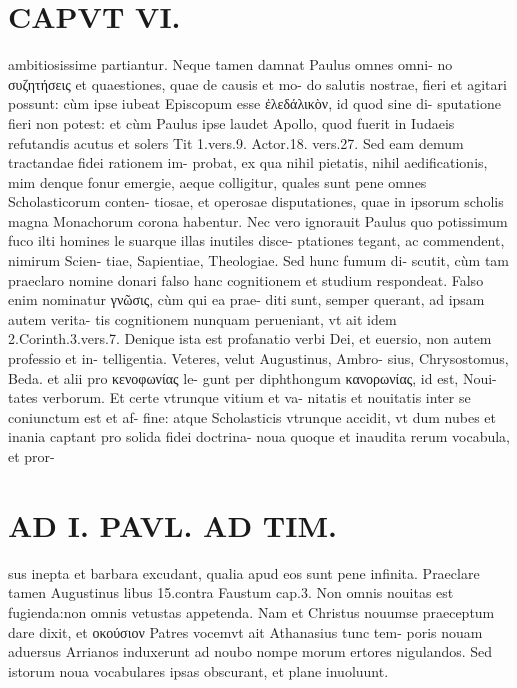 \documentclass{article}
\begin{document}
\begin{pages}
\section*{CAPVT  VI. }
\marginpar{[ p.511 ]}\pstart ambitiosissime partiantur.  \pend\pstart Neque tamen damnat Paulus omnes omni- no συζητήσεις et quaestiones, quae de causis et mo- do salutis nostrae, fieri et agitari possunt: cùm ipse iubeat Episcopum esse ἐλεδάλικὸν, id quod sine di- sputatione fieri non potest: et cùm Paulus ipse laudet Apollo, quod fuerit in Iudaeis refutandis acutus et solers Tit 1.vers.9. Actor.18. vers.27. Sed eam demum tractandae fidei rationem im- probat, ex qua nihil pietatis, nihil aedificationis, mim denque fonur emergie, aeque colligitur, quales sunt pene omnes Scholasticorum conten- tiosae, et operosae disputationes, quae in ipsorum scholis magna Monachorum corona habentur.  \pend\pstart Nec vero ignorauit Paulus quo potissimum fuco ilti homines le suarque illas inutiles disce- ptationes tegant, ac commendent, nimirum Scien- tiae, Sapientiae, Theologiae. Sed hunc fumum di- scutit, cùm tam praeclaro nomine donari falso hanc cognitionem et studium respondeat.  \pend\pstart Falso enim nominatur γνῶσις, cùm qui ea prae- diti sunt, semper querant, ad ipsam autem verita- tis cognitionem nunquam perueniant, vt ait idem 2.Corinth.3.vers.7. Denique ista est profanatio verbi Dei, et euersio, non autem professio et in- telligentia. Veteres, velut Augustinus, Ambro- sius, Chrysostomus, Beda. et alii pro κενοφωνίας le- gunt per diphthongum κανορωνίας, id est, Noui- tates verborum. Et certe vtrunque vitium et va- nitatis et nouitatis inter se coniunctum est et af- fine: atque Scholasticis vtrunque accidit, vt dum nubes et inania captant pro solida fidei doctrina- noua quoque  et inaudita rerum vocabula, et pror-  \pend
\section*{AD I. PAVL. AD TIM. }
\marginpar{[ p.512 ]}\pstart sus inepta et barbara excudant, qualia apud eos sunt pene infinita. Praeclare tamen Augustinus libus 15.contra Faustum cap.3. Non omnis nouitas est fugienda:non omnis vetustas appetenda. Nam et Christus nouumse praeceptum dare dixit, et οκούσιον Patres vocemvt ait Athanasius tunc tem- poris nouam aduersus Arrianos induxerunt ad noubo nompe morum ertores nigulandos. Sed istorum noua vocabulares ipsas obscurant, et plane inuoluunt.  \pend
{}
{}

\end{pages}
\end{document}
